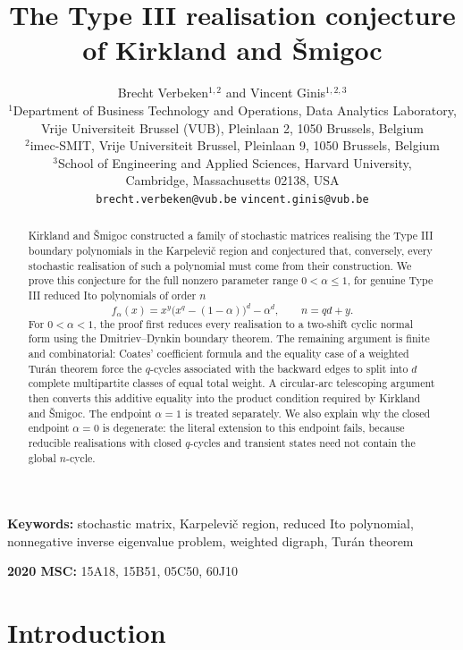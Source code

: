 \documentclass[11pt]{article}
\title{The Type III realisation conjecture of Kirkland and \v{S}migoc}
\author{Brecht Verbeken$^{1,2}$ and Vincent Ginis$^{1,2,3}$\\[0.4em]
\small $^{1}$Department of Business Technology and Operations, Data Analytics Laboratory,\\
\small Vrije Universiteit Brussel (VUB), Pleinlaan 2, 1050 Brussels, Belgium\\
\small $^{2}$imec-SMIT, Vrije Universiteit Brussel, Pleinlaan 9, 1050 Brussels, Belgium\\
\small $^{3}$School of Engineering and Applied Sciences, Harvard University,\\
\small Cambridge, Massachusetts 02138, USA\\[0.4em]
\texttt{brecht.verbeken@vub.be}\quad
\texttt{vincent.ginis@vub.be}}
\date{}
\numberwithin{equation}{section}
\begin{document}
\maketitle

\begin{abstract}
Kirkland and \v{S}migoc constructed a family of stochastic matrices realising
the Type III boundary polynomials in the Karpelevi\v{c} region and conjectured
that, conversely, every stochastic realisation of such a polynomial must come
from their construction. We prove this conjecture for the full nonzero
parameter range $0<\alpha\le1$, for genuine Type III reduced Ito polynomials
of order $n$
\[
        f_\alpha(x)=x^y\bigl(x^q-(1-\alpha)\bigr)^d-\alpha^d,
        \qquad n=qd+y.
\]
For $0<\alpha<1$, the proof first reduces every realisation to a two-shift
cyclic normal form using the Dmitriev--Dynkin boundary theorem. The remaining
argument is finite and combinatorial: Coates' coefficient formula and the
equality case of a weighted Tur\'an theorem force the $q$-cycles associated
with the backward edges to split into $d$ complete multipartite classes of
equal total weight. A circular-arc telescoping argument then converts this
additive equality into the product condition required by Kirkland and
\v{S}migoc. The endpoint $\alpha=1$ is treated separately. We also explain
why the closed endpoint $\alpha=0$ is degenerate: the literal extension to
this endpoint fails, because reducible realisations with closed $q$-cycles and
transient states need not contain the global $n$-cycle.
\end{abstract}

\noindent\textbf{Keywords:} stochastic matrix, Karpelevi\v{c} region,
reduced Ito polynomial, nonnegative inverse eigenvalue problem, weighted
digraph, Tur\'an theorem

\medskip
\noindent\textbf{2020 MSC:} 15A18, 15B51, 05C50, 60J10

\section{Introduction}
\end{document}
